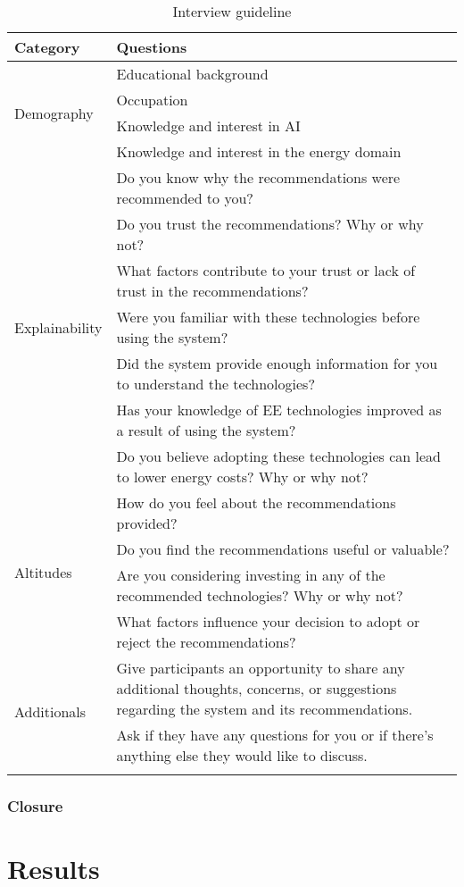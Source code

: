 \begin{center}
  \small
  \begin{longtable}{ | p{} | p{} | }
    \hline
    \textbf{Category} & \textbf{Questions} \\
    \hline
    \multirow{4}{4em}{Demography} & Educational background \\
    & Occupation \\
    & Knowledge and interest in AI \\
    & Knowledge and interest in the energy domain \\
    \hline
    \multirow{7}{4em}{Explainability} & Do you know why the recommendations were recommended to you? \\
    & Do you trust the recommendations? Why or why not? \\
    & What factors contribute to your trust or lack of trust in the recommendations? \\
    & Were you familiar with these technologies before using the system? \\
    & Did the system provide enough information for you to understand the technologies? \\
    & Has your knowledge of EE technologies improved as a result of using the system? \\
    & Do you believe adopting these technologies can lead to lower energy costs? Why or why not? \\
    \hline
    \multirow{4}{4em}{Altitudes} & How do you feel about the recommendations provided? \\
    & Do you find the recommendations useful or valuable? \\
    & Are you considering investing in any of the recommended technologies? Why or why not? \\
    & What factors influence your decision to adopt or reject the recommendations? \\
    \hline
    \multirow{2}{4em}{Additionals} & Give participants an opportunity to share any additional thoughts, concerns, or suggestions regarding the system and its recommendations. \\
    & Ask if they have any questions for you or if there's anything else they would like to discuss. \\
    \hline
  \caption{Interview guideline}
  \label{tab:interview}
  \end{longtable}
\end{center}


\subsubsection{Closure}



\section{Results}
